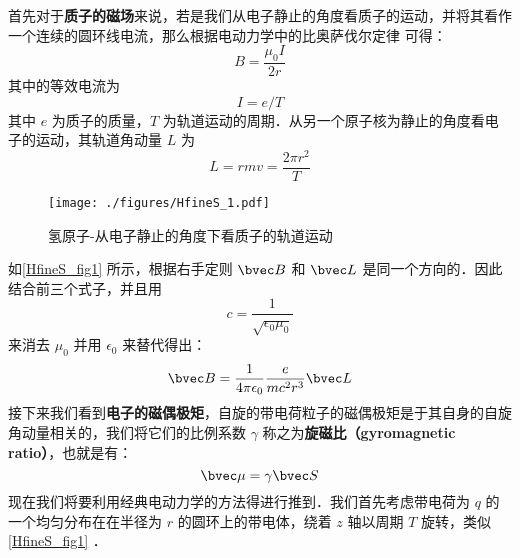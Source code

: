 首先对于\textbf{质子的磁场}来说，若是我们从电子静止的角度看质子的运动，并将其看作一个连续的圆环线电流，那么根据电动力学中的比奥萨伐尔定律 可得：
\begin{equation}
B=\frac{\mu_0I}{2r}
\end{equation}
其中的等效电流为
\begin{equation}
I=e/T
\end{equation}
其中 $e$ 为质子的质量，$T$ 为轨道运动的周期．从另一个原子核为静止的角度看电子的运动，其轨道角动量 $L$ 为
\begin{equation}
L=rmv=\frac{2\pi r^2}{T}
\end{equation}
\begin{figure}[ht]
\centering
\texttt{[image: ./figures/HfineS\_1.pdf]}
\caption{氢原子-从电子静止的角度下看质子的轨道运动} \label{HfineS_fig1}
\end{figure}
如\autoref{HfineS_fig1} 所示，根据右手定则 $\bvec B$ 和 $\bvec L$ 是同一个方向的．因此结合前三个式子，并且用
\begin{equation}
c=\frac{1}{\sqrt{\epsilon_0\mu_0}}
\end{equation}
来消去 $\mu_0$ 并用 $\epsilon_0$ 来替代得出：
\begin{equation}\label{HfineS_eq31}
\bvec B = \frac{1}{4\pi\epsilon_0}\frac{e}{mc^2r^3}\bvec L
\end{equation}
接下来我们看到\textbf{电子的磁偶极矩}，自旋的带电荷粒子的磁偶极矩是于其自身的自旋角动量相关的，我们将它们的比例系数 $\gamma$ 称之为\textbf{旋磁比（gyromagnetic
ratio）}，也就是有：
\begin{equation}
\bvec\mu=\gamma\bvec S
\end{equation}
现在我们将要利用经典电动力学的方法得进行推到．我们首先考虑带电荷为 $q$ 的一个均匀分布在在半径为 $r$ 的圆环上的带电体，绕着 $z$ 轴以周期 $T$ 旋转，类似\autoref{HfineS_fig1} ．

